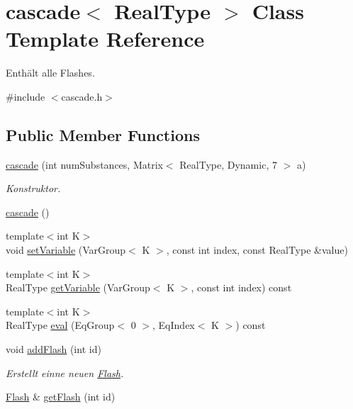 \hypertarget{classcascade}{}\section{cascade$<$ Real\+Type $>$ Class Template Reference}
\label{classcascade}


Enthält alle Flashes.  




{\ttfamily \#include $<$cascade.\+h$>$}

\subsection*{Public Member Functions}
\begin{DoxyCompactItemize}
\item 
\mbox{\hyperlink{classcascade_ac437f03d454f773e195b4528cce89cc9}{cascade}} (int num\+Substances, Matrix$<$ Real\+Type, Dynamic, 7 $>$ a)
\begin{DoxyCompactList}\small\item\em Konstruktor. \end{DoxyCompactList}\item 
\mbox{\hyperlink{classcascade_a368b15328ebb48ae4af81dacd2d3165f}{cascade}} ()
\item 
{\footnotesize template$<$int K$>$ }\\void \mbox{\hyperlink{classcascade_a2195202880e150925ff465597830981c}{set\+Variable}} (Var\+Group$<$ K $>$, const int index, const Real\+Type \&value)
\item 
{\footnotesize template$<$int K$>$ }\\Real\+Type \mbox{\hyperlink{classcascade_a9f4e1a91f1f15ffc2af36a825a95a67d}{get\+Variable}} (Var\+Group$<$ K $>$, const int index) const
\item 
{\footnotesize template$<$int K$>$ }\\Real\+Type \mbox{\hyperlink{classcascade_abff441f97a7e505609a1ba09973d64b8}{eval}} (Eq\+Group$<$ 0 $>$, Eq\+Index$<$ K $>$) const
\item 
void \mbox{\hyperlink{classcascade_a04cb46ee066fb830e25828fc28cec392}{add\+Flash}} (int id)
\begin{DoxyCompactList}\small\item\em Erstellt einne neuen \mbox{\hyperlink{class_flash}{Flash}}. \end{DoxyCompactList}\item 
\mbox{\hyperlink{class_flash}{Flash}} \& \mbox{\hyperlink{classcascade_a3da9e284a344a7f24512f54fabe2fa70}{get\+Flash}} (int id)

\end{DoxyCompactItemize}
